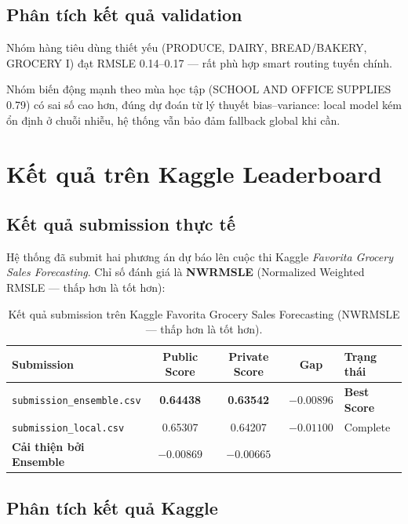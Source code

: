\documentclass[12pt,a4paper]{report}
\begin{document}
\subsection{Phân tích kết quả validation}

Nhóm hàng tiêu dùng thiết yếu (PRODUCE, DAIRY, BREAD/BAKERY, GROCERY I) đạt RMSLE 0.14--0.17 --- rất phù hợp smart routing tuyến chính.

Nhóm biến động mạnh theo mùa học tập (SCHOOL AND OFFICE SUPPLIES 0.79) có sai số cao hơn, đúng dự đoán từ lý thuyết bias--variance: local model kém ổn định ở chuỗi nhiễu, hệ thống vẫn bảo đảm fallback global khi cần.

\section{Kết quả trên Kaggle Leaderboard}

\subsection{Kết quả submission thực tế}

Hệ thống đã submit hai phương án dự báo lên cuộc thi Kaggle \textit{Favorita Grocery Sales Forecasting}. Chỉ số đánh giá là \textbf{NWRMSLE} (Normalized Weighted RMSLE --- thấp hơn là tốt hơn):

\begin{table}[h!]
\centering
\begin{tabular}{@{}lcccl@{}}
\toprule
\textbf{Submission} & \textbf{Public Score} & \textbf{Private Score} & \textbf{Gap} & \textbf{Trạng thái} \\
\midrule
\texttt{submission\_ensemble.csv} & \textbf{0.64438} & \textbf{0.63542} & $-0.00896$ & \textbf{Best Score} \\
\texttt{submission\_local.csv} & 0.65307 & 0.64207 & $-0.01100$ & Complete \\
\midrule
\textbf{Cải thiện bởi Ensemble} & \textbf{$-0.00869$} & \textbf{$-0.00665$} & & \\
\bottomrule
\end{tabular}
\caption{Kết quả submission trên Kaggle Favorita Grocery Sales Forecasting (NWRMSLE --- thấp hơn là tốt hơn).}
\label{tab:kaggle}
\end{table}

\subsection{Phân tích kết quả Kaggle}
\end{document}
